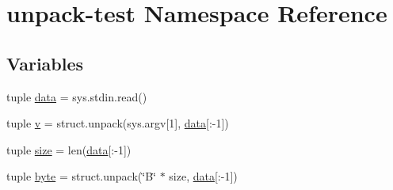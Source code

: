 \hypertarget{namespaceunpack-test}{\section{unpack-\/test Namespace Reference}
\label{namespaceunpack-test}
}
\subsection*{Variables}
\begin{DoxyCompactItemize}
\item 
tuple \hyperlink{namespaceunpack-test_a3658f239ff3dd1c4b74ee01aa28503ae}{data} = sys.\-stdin.\-read()
\item 
tuple \hyperlink{namespaceunpack-test_a0b46ee9f8c169bb06c3f38266388decd}{v} = struct.\-unpack(sys.\-argv\mbox{[}1\mbox{]}, \hyperlink{namespaceunpack-test_a3658f239ff3dd1c4b74ee01aa28503ae}{data}\mbox{[}\-:-\/1\mbox{]})
\item 
tuple \hyperlink{namespaceunpack-test_a2bd26e3ecd1f57e05d13af8753da003c}{size} = len(\hyperlink{namespaceunpack-test_a3658f239ff3dd1c4b74ee01aa28503ae}{data}\mbox{[}\-:-\/1\mbox{]})
\item 
tuple \hyperlink{namespaceunpack-test_a055c4497265d0014aa3db51153f7bce7}{byte} = struct.\-unpack(\char`\"{}B\char`\"{} $\ast$ size, \hyperlink{namespaceunpack-test_a3658f239ff3dd1c4b74ee01aa28503ae}{data}\mbox{[}\-:-\/1\mbox{]})
\end{DoxyCompactItemize}



